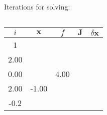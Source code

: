 \begin{frame}[fragile]
    Iterations for solving:\newline
    \begin{columns}
    \begin{tabular}{|c|c|c|c|c|}
      \hline
      \( i \) & \( \mathbf{x} \) & \( f \) & \( \mathbf{J} \) & \( \delta \mathbf{x} \) \\
      \hline
      1 & \(\begin{bmatrix}1.00\\2.00\end{bmatrix} \)  & \(\begin{bmatrix}1.00\\0.00\end{bmatrix} \)               & \(\begin{bmatrix} 2.00  & 4.00  \\ 2.00  & -1.00 \end{bmatrix}\) & \(\begin{bmatrix} -0.1                 \\ -0.2                 \end{bmatrix}\) \\

\end{tabular}
\end{columns}
\end{frame}
